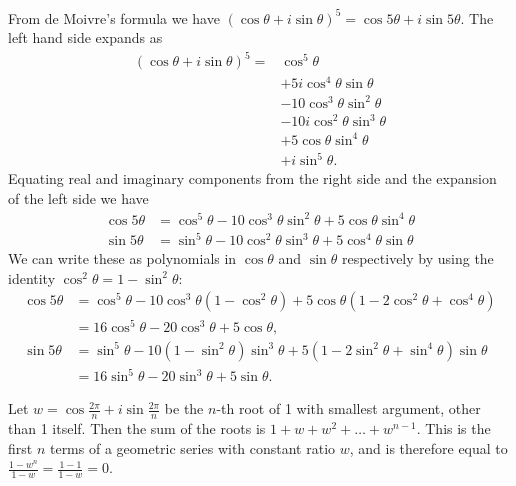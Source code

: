 \documentclass[12pt]{article}
\begin{document}
\begin{description}
  From de Moivre's formula we have
  $(\cos\theta + i\sin\theta)^5 = \cos 5\theta + i\sin 5\theta$. The left hand
  side expands as
  \begin{align*}
  (\cos\theta + i\sin\theta)^5 =& \cos^5\theta \\
                               &+ 5i\cos^4\theta\sin\theta \\
                               &- 10\cos^3\theta\sin^2\theta \\
                               &- 10i\cos^2\theta\sin^3\theta \\
                               &+ 5\cos\theta\sin^4\theta \\
                               &+ i\sin^5\theta.
  \end{align*}
  Equating real and imaginary components from the right side and the expansion of
  the left side we have
  \begin{align*}
  \cos 5\theta &= \cos^5\theta - 10\cos^3\theta\sin^2\theta + 5\cos\theta\sin^4\theta \\
  \sin 5\theta &= \sin^5\theta - 10\cos^2\theta\sin^3\theta + 5\cos^4\theta\sin\theta
  \end{align*}
  We can write these as polynomials in $\cos\theta$ and $\sin\theta$
  respectively by using the identity $\cos^2\theta = 1 - \sin^2\theta$:
  \begin{align*}
  \cos 5\theta
  &= \cos^5\theta - 10\cos^3\theta(1 - \cos^2\theta) + 5\cos\theta(1 - 2\cos^2\theta + \cos^4\theta) \\
  &= 16\cos^5\theta - 20\cos^3\theta + 5\cos\theta, \\
  \sin 5\theta
  &= \sin^5\theta - 10(1 - \sin^2\theta)\sin^3\theta + 5(1 - 2\sin^2\theta + \sin^4\theta)\sin\theta \\
  &= 16\sin^5\theta - 20\sin^3\theta + 5\sin\theta.
  \end{align*}


Let $w = \cos \frac{2\pi}{n} + i\sin \frac{2\pi}{n}$ be the $n$-th root of 1
with smallest argument, other than 1 itself. Then the sum of the roots is
$1 + w + w^2 + \ldots + w^{n-1}$. This is the first $n$ terms of a geometric
series with constant ratio $w$, and is therefore equal to
$\frac{1 - w^{n}}{1 - w} = \frac{1 - 1}{1 - w} = 0$.




\end{description}
\end{document}
